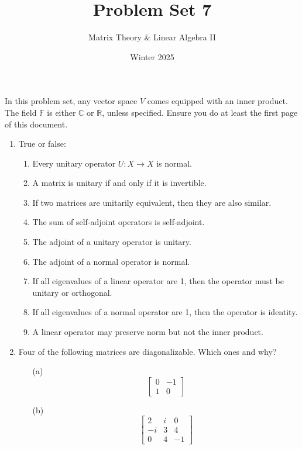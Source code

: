\documentclass[a4paper,11pt]{article}
\title{Problem Set 7}
\author{Matrix Theory \& Linear Algebra II}
\date{Winter 2025}
\theoremstyle{definition}
\begin{document}
\maketitle
\thispagestyle{empty}


\noindent
In this problem set, any vector space $V$ comes equipped with an inner product.
The field $\mathbb F$ is either $\mathbb C$ or $\mathbb R$, unless specified.
Ensure you do at least the first page of this document.

\begin{enumerate}[(1)]
    \item 
    True or false:
    \begin{enumerate}
    \item Every unitary operator $U : X \to X$ is normal.
    \item A matrix is unitary if and only if it is invertible.
    \item If two matrices are unitarily equivalent, then they are also similar.
    \item The sum of self-adjoint operators is self-adjoint.
    \item The adjoint of a unitary operator is unitary.
    \item The adjoint of a normal operator is normal.
    \item If all eigenvalues of a linear operator are 1, then the operator must be unitary or orthogonal.
    \item If all eigenvalues of a normal operator are 1, then the operator is identity.
    \item A linear operator may preserve norm but not the inner product.
    \end{enumerate}

    
    \item 
    Four of the following matrices are diagonalizable. Which ones and why?
    \begin{multicols}{2}
    \begin{enumerate}
    \item[(a)]
    \[
    \begin{bmatrix}
    0 & -1 \\
    1 & 0
    \end{bmatrix}
    \]
    
    \item[(b)]
    \[
    \begin{bmatrix}
    2 & i & 0 \\
    -i & 3 & 4 \\
    0 & 4 & -1
    \end{bmatrix}
    \]
    

\end{enumerate}
\end{multicols}
\end{enumerate}
\end{document}
